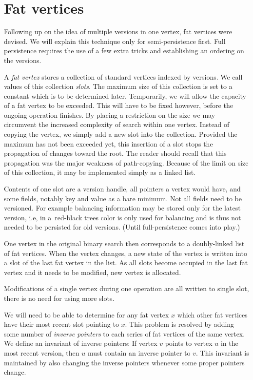 

\section{Fat vertices}

Following up on the idea of multiple versions in one vertex, fat vertices were devised. 
We will explain this technique only for semi-persistence first. 
Full persistence requires the use of a few extra tricks and establishing an ordering on the versions.

A \emph{fat vertex} stores a collection of standard vertices indexed by versions. 
We call values of this collection \emph{slots}. 
The maximum size of this collection is set to a constant which is to be determined later. 
Temporarily, we will allow the capacity of a fat vertex to be exceeded. 
This will have to be fixed however, before the ongoing operation finishes.
By placing a restriction on the size we may circumvent the increased complexity of search within one vertex.
Instead of copying the vertex, we simply add a new slot into the collection. 
Provided the maximum has not been exceeded yet, this insertion of a slot stops the propagation of changes toward the root. 
The reader should recall that this propagation was the major weakness of path-copying.
Because of the limit on size of this collection, it may be implemented simply as a linked list.

Contents of one slot are a version handle, all pointers a vertex would have, and some fields, notably key and value as a bare minimum.
Not all fields need to be versioned. 
For example balancing information may be stored only for the latest version, i.e, in a~red-black trees color is only used for balancing and is thus not needed to be persisted for old versions. 
(Until full-persistence comes into play.)

One vertex in the original binary search then corresponds to a doubly-linked list of fat vertices.
When the vertex changes, a new state of the vertex is written into a slot of the last fat vertex in the list. 
As all slots become occupied in the last fat vertex and it needs to be modified, new vertex is allocated.

Modifications of a single vertex during one operation are all written to single slot, there is no need for using more slots.

We will need to be able to determine for any fat vertex $x$ which other fat vertices have their most recent slot pointing to $x$. 
This problem is resolved by adding some number of \emph{inverse pointers} to each series of fat vertices of the same vertex. 
We define an invariant of inverse pointers: If vertex $v$ points to vertex $u$ in the most recent version, then $u$ must contain an inverse pointer to $v$. This invariant is maintained by also changing the inverse pointers whenever some proper pointers change. 

